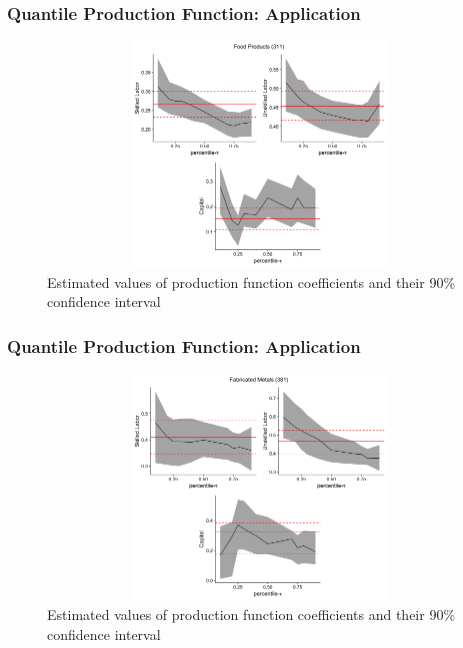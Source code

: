 \documentclass{beamer}
\begin{document}

\begin{frame}
\frametitle{Quantile Production Function: Application}
\begin{figure}[H]
\centering
\caption{Estimated values of production function coefficients and their 90\% confidence interval}
\includegraphics[width=12cm, height=6cm, keepaspectratio]{Coefficient_Plot_1.png}
\end{figure}
\end{frame}


\begin{frame}
\frametitle{Quantile Production Function: Application}
\begin{figure}[H]
\centering
\caption{Estimated values of production function coefficients and their 90\% confidence interval}
\includegraphics[width=12cm, height=6cm, keepaspectratio]{Coefficient_Plot_2.png}
\end{figure}
\end{frame}

\end{document}
